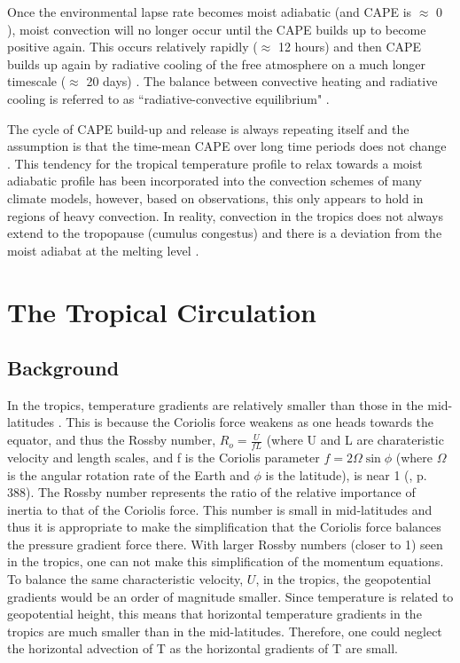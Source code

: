 \documentclass[letterpaper,12pt,titlepage,oneside,final]{book}
\begin{document}
 Once the environmental lapse rate becomes moist adiabatic (and CAPE is $\approx$ 0 \cite{merlis_general_2012}), moist convection will no longer occur until the CAPE builds up to become positive again. This occurs relatively rapidly ($\approx$ 12 hours) and then CAPE builds up again by radiative cooling of the free atmosphere on a much longer timescale ($\approx$ 20 days) \citep{merlis_general_2012}. The balance between convective heating and radiative cooling is referred to as ``radiative-convective equilibrium" \citep{manabe_thermal_1967}.

The cycle of CAPE build-up and release is always repeating itself and the assumption is that the time-mean CAPE over long time periods does not change \citep{emanuel_quasi-equilibrium_2007}. This tendency for the tropical temperature profile to relax towards a moist adiabatic profile has been incorporated into the convection schemes of many climate models, however, based on observations, this only appears to hold in regions of heavy convection. In reality, convection in the tropics does not always extend to the tropopause (cumulus congestus) and there is a deviation from the moist adiabat at the melting level \citep{folkins_melting_2013}.

\section{The Tropical Circulation}
\subsection{Background}\label{wtg}
In the tropics, temperature gradients are relatively smaller than those in the mid-latitudes \citep{sobel_weak_2001}. This is because the Coriolis force weakens as one heads towards the equator, and thus the Rossby number, $R_{o}=\frac{U}{fL}$ (where U and L are charateristic velocity and length scales, and f is the Coriolis parameter $f=2\Omega\sin{\phi}$ (where $\Omega$ is the angular rotation rate of the Earth and $\phi$ is the latitude), is near 1 (\citep{holton_introduction_2004}, p. 388). The Rossby number represents the ratio of the relative importance of inertia to that of the Coriolis force. This number is small in mid-latitudes and thus it is appropriate to make the simplification that the Coriolis force balances the pressure gradient force there. With larger Rossby numbers (closer to 1) seen in the tropics, one can not make this simplification of the momentum equations. To balance the same characteristic velocity, $U$, in the tropics, the geopotential gradients would be an order of magnitude smaller. Since temperature is related to geopotential height, this means that horizontal temperature gradients in the tropics are much smaller than in the mid-latitudes. Therefore, one could neglect the horizontal advection of T as the horizontal gradients of T are small. 
\end{document}
